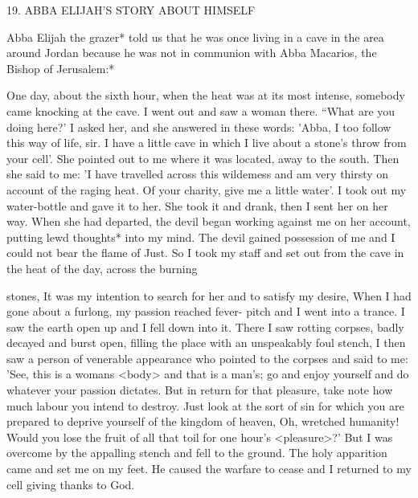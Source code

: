 19. ABBA ELIJAH'S STORY ABOUT HIMSELF

Abba Elijah the grazer* told us that he was once living in a cave in
the area around Jordan because he was not in communion with
Abba Macarios, the Bishop of Jerusalem:*

One day, about the sixth hour, when the heat was at its most
intense, somebody came knocking at the cave. I went out and saw
a woman there. “What are you doing here?' I asked her, and she
answered in these words: 'Abba, I too follow this way of life, sir. I
have a little cave in which I live about a stone's throw from your
cell'. She pointed out to me where it was located, away to the south.
Then she said to me: 'I have travelled across this wildemess and am
very thirsty on account of the raging heat. Of your charity, give me
a little water'. I took out my water-bottle and gave it to her. She
took it and drank, then I sent her on her way. When she had
departed, the devil began working against me on her account,
putting lewd thoughts* into my mind. The devil gained possession
of me and I could not bear the flame of Just. So I took my staff and
set out from the cave in the heat of the day, across the burning

stones, It was my intention to search for her and to satisfy my
desire, When I had gone about a furlong, my passion reached fever-
pitch and I went into a trance. I saw the earth open up and I fell
down into it. There I saw rotting corpses, badly decayed and burst
open, filling the place with an unspeakably foul stench, I then saw
a person of venerable appearance who pointed to the corpses and
said to me: 'See, this is a woman\textquotesingle s <body> and that is a man's; go
and enjoy yourself and do whatever your passion dictates. But in
return for that pleasure, take note how much labour you intend to
destroy. Just look at the sort of sin for which you are prepared to
deprive yourself of the kingdom of heaven, Oh, wretched humanity!
Would you lose the fruit of all that toil for one hour's <pleasure>?'
But I was overcome by the appalling stench and fell to the ground.
The holy apparition came and set me on my feet. He caused the
warfare to cease and I returned to my cell giving thanks to God.

